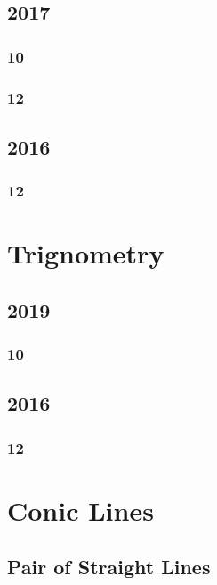 \documentclass[11pt]{book}
\begin{document}
\section{2017}
\subsection{10}

\subsection{12}



\section{2016}
\subsection{12}






\chapter{Trignometry}
\section{2019}
\subsection{10}

\section{2016}
\subsection{12}






% 
\backmatter
\appendix
\iffalse
\chapter{Conic Lines}
\section{Pair of Straight Lines}
%

\end{document}
